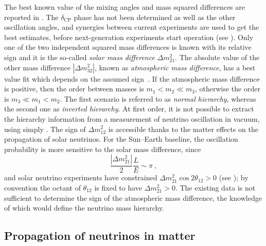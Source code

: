 The best known value of the mixing angles and mass squared differences are reported in .
The $\delta_\text{CP}$ phase has not been determined as well as the other oscillation angles, %
and synergies between current experiments are used to get the best estimates, before %
next-generation experiments start operation (see ).
Only one of the two independent squared mass differences is known with its relative sign and %
it is the so-called \emph{solar mass difference} $\Delta m_{21}^2$.
The absolute value of the other mass difference $|\Delta m_{32}^2|$, %
known as \emph{atmospheric mass difference}, has a best value fit which depends on the assumed sign~\cite{Esteban:2018azc}.
If the atmospheric mass difference is positive, then the order between masses is $m_1 < m_2 \ll m_3$, %
otherwise the order is $m_3 \ll m_1 < m_2$.
The first scenario is referred to as \emph{normal hierarchy}, whereas the second one as \emph{inverted hierarchy}.
At first order, it is not possible to extract the hierarchy information from a measurement of neutrino oscillation in vacuum, %
using simply .
The sign of $\Delta m_{12}^2$ is accessible thanks to the matter effects on the propagation of solar neutrinos.
For the Sun--Earth baseline, the oscillation probability is more sensitive to the solar mass difference, since %
\begin{equation}
	\frac{|\Delta m_{21}^2|}{2} \frac{L}{E} \sim \pi\ ,
\end{equation}
and solar neutrino experiments have constrained $\Delta m_{21}^2 \cos 2\theta_{12} > 0$ (see );
by convention the octant of $\theta_{12}$ is fixed to have $\Delta m_{21}^2 > 0$.
The existing data is not sufficient to determine the sign of the atmospheric mass difference, 
the knowledge of which would define the neutrino mass hierarchy.



\subsection{Propagation of neutrinos in matter}
\label{sec:neutrino_matter}

